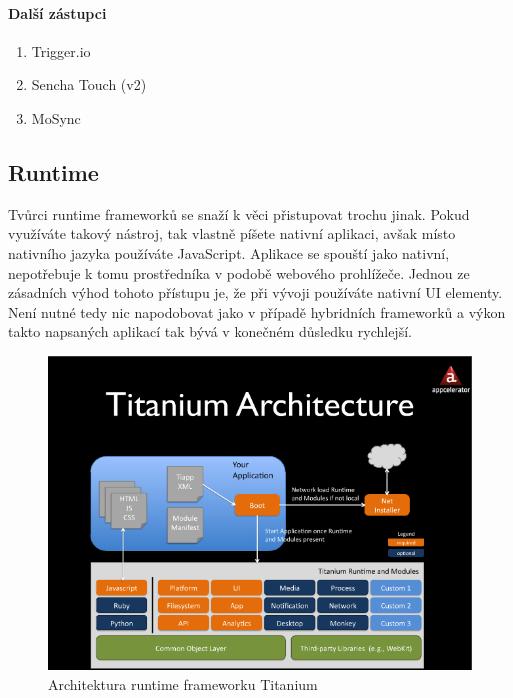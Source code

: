 \paragraph{Další zástupci}
\begin{enumerate}
	\item Trigger.io
	\item Sencha Touch (v2)
	\item MoSync
\end{enumerate}

\subsection{Runtime}
Tvůrci runtime frameworků se snaží k věci přistupovat trochu jinak. Pokud využíváte takový nástroj, tak vlastně píšete nativní aplikaci, avšak místo nativního jazyka používáte JavaScript. Aplikace se spouští jako nativní, nepotřebuje k tomu prostředníka v podobě webového prohlížeče. Jednou ze zásadních výhod tohoto přístupu je, že při vývoji používáte nativní UI elementy. Není nutné tedy nic napodobovat jako v případě hybridních frameworků a výkon takto napsaných aplikací tak bývá v konečném důsledku rychlejší.

\begin{figure}\centering
\includegraphics[width=1.0\textwidth]{titanium_architecture.png}
\caption{Architektura runtime frameworku Titanium \cite{architecture_titanium}}
\label{fig:TitaniumArchitecture}
\end{figure}

